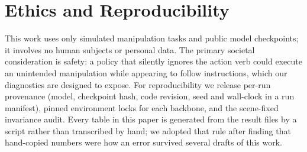 \documentclass[11pt]{article}
\begin{document}
\section*{Ethics and Reproducibility}
This work uses only simulated manipulation tasks and public model checkpoints; it
involves no human subjects or personal data. The primary societal consideration is
safety: a policy that silently ignores the action verb could execute an unintended
manipulation while appearing to follow instructions, which our diagnostics are
designed to expose. For reproducibility we release per-run provenance (model,
checkpoint hash, code revision, seed and wall-clock in a run manifest), pinned
environment locks for each backbone, and the scene-fixed invariance audit. Every
table in this paper is generated from the result files by a script rather than
transcribed by hand; we adopted that rule after finding that hand-copied numbers
were how an error survived several drafts of this work.



\end{document}
